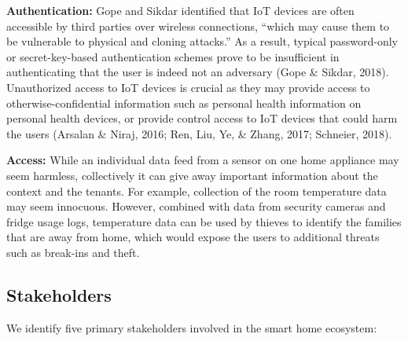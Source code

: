 {\bf Authentication:} Gope and Sikdar identified that IoT devices are often accessible by third parties over wireless connections, “which may cause them to be vulnerable to physical and cloning attacks.” As a result, typical password-only or secret-key-based authentication schemes prove to be insufficient in authenticating that the user is indeed not an adversary (Gope \& Sikdar, 2018). Unauthorized access to IoT devices is crucial as they may provide access to otherwise-confidential information such as personal health information on personal health devices, or provide control access to IoT devices that could harm the users (Arsalan \& Niraj, 2016; Ren, Liu, Ye, \& Zhang, 2017; Schneier, 2018).

{\bf Access:} While an individual data feed from a sensor on one home appliance may seem harmless, collectively it can give away important information about the context and the tenants. For example, collection of the room temperature data may seem innocuous. However, combined with data from security cameras and fridge usage logs, temperature data can be used by thieves to identify the families that are away from home, which would expose the users to additional threats such as break-ins and theft.

\subsection{Stakeholders}

We identify five primary stakeholders involved in the smart home ecosystem:

